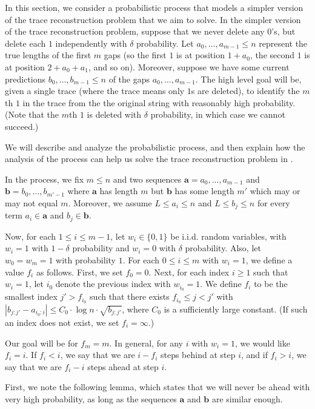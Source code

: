 \documentclass[12pt]{article}
\theoremstyle{definition}
\theoremstyle{remark}
\newcommand{\ba}{\mathbf a}
\newcommand{\bb}{\mathbf b}
\begin{document}
In this section, we consider a probabilistic process that models a simpler version of the trace reconstruction problem that we aim to solve. In the simpler version of the trace reconstruction problem, suppose that we never delete any $0$'s, but delete each $1$ independently with $\delta$ probability. Let $a_0, \dots, a_{m-1} \le n$ represent the true lengths of the first $m$ gaps (so the first $1$ is at position $1+a_0$, the second $1$ is at position $2 + a_0 + a_1$, and so on). Moreover, suppose we have some current predictions $b_0, \dots, b_{m-1} \le n$ of the gaps $a_0, \dots, a_{m-1}$. The high level goal will be, given a single trace (where the trace means only $1$s are deleted), to identify the $m$th $1$ in the trace from the the original string with reasonably high probability. (Note that the $m$th $1$ is deleted with $\delta$ probability, in which case we cannot succeed.)

We will describe and analyze the probabilistic process, and then explain how the analysis of the process can help us solve the trace reconstruction problem in .

In the process, we fix $m \le n$ and two sequences $\ba = a_0, \dots, a_{m-1}$ and $\bb = b_0, \dots, b_{m'-1}$ where $\ba$ has length $m$ but $\bb$ has some length $m'$ which may or may not equal $m$.
Moreover, we assume $L \le a_i \le n$ and $L \le b_j \le n$ for every term $a_i \in \ba$ and $b_j \in \bb.$ 



Now, for each $1 \le i \le m-1$, let $w_i \in \{0, 1\}$ be i.i.d. random variables, with $w_i = 1$ with $1-\delta$ probability and $w_i = 0$ with $\delta$ probability. Also, let $w_0 = w_m = 1$ with probability $1$.
For each $0 \le i \le m$ with $w_i = 1$, we define a value $f_i$ as follows. First, we set $f_0 = 0$. Next, for each index $i \ge 1$ such that $w_i = 1$, let $i_0$ denote the previous index with $w_{i_0} = 1$. We define $f_i$ to be the smallest index $j' > f_{i_0}$ such that there exists $f_{i_0} \le j < j'$ with $|b_{j:j'} - a_{i_0:i}| \le C_0 \cdot \log n \cdot \sqrt{b_{j:j'}}$, where $C_0$ is a sufficiently large constant. (If such an index does not exist, we set $f_i = \infty$.) 

Our goal will be for $f_m = m$. In general, for any $i$ with $w_i = 1$, we would like $f_i = i$. If $f_i < i$, we say that we are $i-f_i$ steps behind at step $i$, and if $f_i > i$, we say that we are $f_i-i$ steps ahead at step $i$.

First, we note the following lemma, which states that we will never be ahead with very high probability, as long as the sequences $\ba$ and $\bb$ are similar enough.
\end{document}
